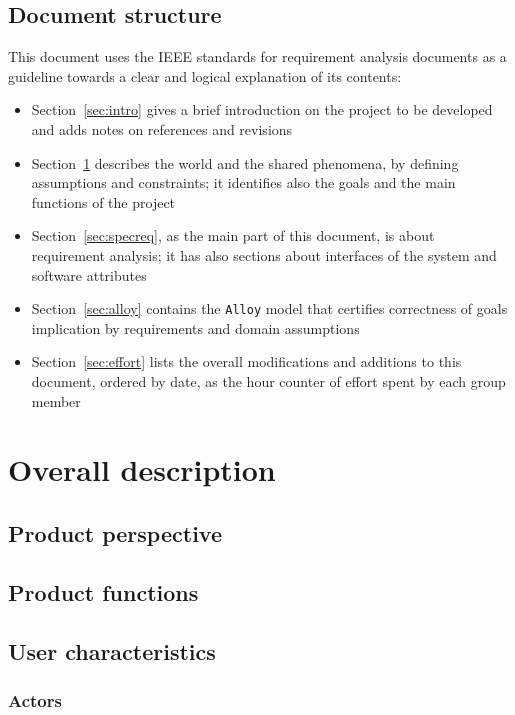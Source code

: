 \documentclass[12pt]{article}
\begin{document}
  \subsection{Document structure}

    This document uses the IEEE standards for requirement analysis documents as a guideline towards a clear and logical explanation of its contents:
    \begin{itemize}
      \item Section~\ref{sec:intro} gives a brief introduction on the project to be developed and adds notes on references and revisions
      \item Section~\ref{sec:overdesc} describes the world and the shared phenomena, by defining assumptions and constraints; it identifies also the goals and the main functions of the project
      \item Section~\ref{sec:specreq}, as the main part of this document, is about requirement analysis; it has also sections about interfaces of the system and software attributes
      \item Section~\ref{sec:alloy} contains the \texttt{Alloy} model that certifies correctness of goals implication by requirements and domain assumptions
      \item Section~\ref{sec:effort} lists the overall modifications and additions to this document, ordered by date, as the hour counter of effort spent by each group member
    \end{itemize}

\clearpage
\section{Overall description}
\label{sec:overdesc}

  \subsection{Product perspective}
  \subsection{Product functions}
  \subsection{User characteristics}

    \subsubsection{Actors}
\end{document}
